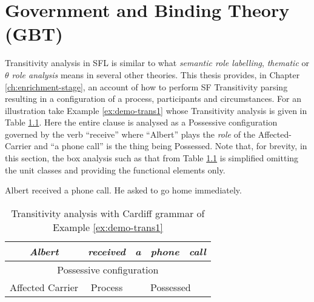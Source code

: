 \chapter{Government and Binding Theory (GBT)}
\label{ch:gbt}



    Transitivity analysis in SFL is similar to what \textit{semantic role labelling}, \textit{thematic} or \textit{$\theta$ role analysis} means in several other theories. This thesis provides, in Chapter \ref{ch:enrichment-stage}, an account of how to perform SF Transitivity parsing resulting in a configuration of a process, participants and circumstances. For an illustration take Example \ref{ex:demo-trans1} whose Transitivity analysis is given in Table \ref{tab:demo-trans1}. Here the entire clause is analysed as a Possessive configuration governed by the verb ``receive'' where ``Albert'' plays the \textit{role} of the Affected-Carrier and ``a phone call'' is the thing being Possessed. Note that, for brevity, in this section, the box analysis such as that from Table \ref{tab:demo-trans1} is simplified omitting the unit classes and providing the functional elements only. 

    \begin{exe}
        \ex\label{ex:demo-trans1} Albert received a phone call.
        \ex\label{ex:demo-trans2} He asked to go home immediately.
    \end{exe}

    \begin{table}[!ht]
        \centering
        \begin{tabular}{|c|c|c|c|c|}
            \hline
            \textit{Albert}  & \textit{received} & \textit{a} & \textit{phone} & \textit{call} \\ \hline
            \multicolumn{5}{|c|}{Possessive configuration}                                     \\ \hline
            Affected Carrier & Process           & \multicolumn{3}{c|}{Possessed}               \\ \hline
        \end{tabular}
        \caption{Transitivity analysis with Cardiff grammar of Example \ref{ex:demo-trans1}}
        \label{tab:demo-trans1}
    \end{table}

